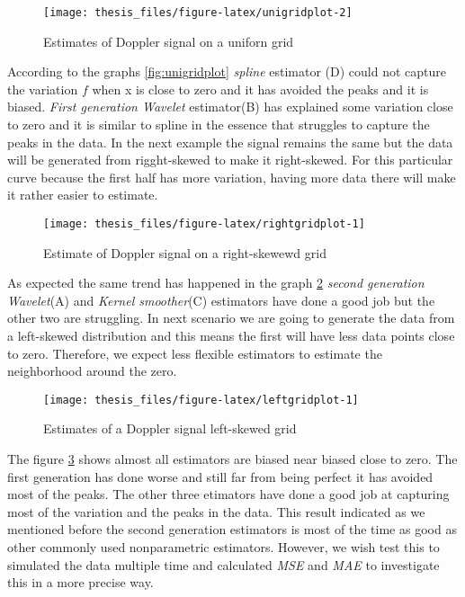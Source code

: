 \documentclass[12pt,twoside, a4paper]{reedthesis}
\begin{document}
\begin{figure}[htb!]

{\centering \texttt{[image: thesis\_files/figure-latex/unigridplot-2]} 

}

\caption{\label{fig:unigridplot} Estimates of Doppler signal on a uniforn grid}\label{fig:unigridplot2}
\end{figure}
According to the graphs \ref{fig:unigridplot} \emph{spline} estimator (D) could not capture the variation \(f\) when x is close to zero and it has avoided the peaks and it is biased. \emph{First generation Wavelet} estimator(B) has explained some variation close to zero and it is similar to spline in the essence that struggles to capture the peaks in the data.
In the next example the signal remains the same but the data will be generated from rigght-skewed to make it right-skewed. For this particular curve because the first half has more variation, having more data there will make it rather easier to estimate.
\begin{figure}[htb!]

{\centering \texttt{[image: thesis\_files/figure-latex/rightgridplot-1]} 

}

\caption{ \label{fig:rightgridplot} Estimate of Doppler signal on a right-skewewd grid}\label{fig:rightgridplot}
\end{figure}
As expected the same trend has happened in the graph \ref{fig:rightgridplot} \emph{second generation Wavelet}(A) and \emph{Kernel smoother}(C) estimators have done a good job but the other two are struggling. In next scenario we are going to generate the data from a left-skewed distribution and this means the first will have less data points close to zero. Therefore, we expect less flexible estimators to estimate the neighborhood around the zero.
\begin{figure}[htb!]

{\centering \texttt{[image: thesis\_files/figure-latex/leftgridplot-1]} 

}

\caption{\label{fig:leftgridplot}Estimates of a Doppler signal left-skewed grid}\label{fig:leftgridplot}
\end{figure}
The figure \ref{fig:leftgridplot} shows almost all estimators are biased near biased close to zero. The first generation has done worse and still far from being perfect it has avoided most of the peaks. The other three etimators have done a good job at capturing most of the variation and the peaks in the data. This result indicated as we mentioned before the second generation estimators is most of the time as good as other commonly used nonparametric estimators. However, we wish test this to simulated the data multiple time and calculated \emph{MSE} and \emph{MAE} to investigate this in a more precise way.
\end{document}
